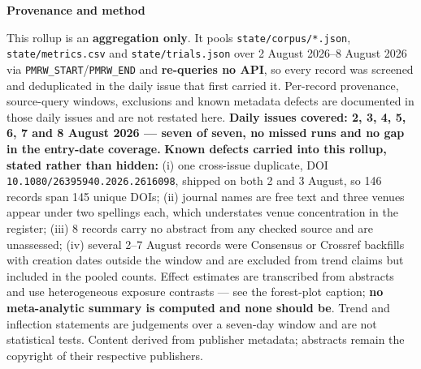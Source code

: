 \documentclass[10pt]{article}
\newcommand{\PERIODSTART}{2 August 2026}
\newcommand{\PERIODEND}{8 August 2026}
\begin{document}
\vspace{4mm}
\begin{keybox}
{\sffamily\bfseries\footnotesize\color{Deep}Provenance and method}\\[1.2mm]
{\fontsize{7.2}{8.8}\selectfont
This rollup is an \textbf{aggregation only}. It pools \texttt{state/corpus/*.json},
\texttt{state/metrics.csv} and \texttt{state/trials.json} over
\PERIODSTART{}--\PERIODEND{} via \texttt{PMRW\_START}/\texttt{PMRW\_END} and
\textbf{re-queries no API}, so every record was screened and deduplicated in the daily
issue that first carried it. Per-record provenance, source-query windows, exclusions and
known metadata defects are documented in those daily issues and are not restated here.
\textbf{Daily issues covered: 2, 3, 4, 5, 6, 7 and 8 August 2026 --- seven of seven, no
missed runs and no gap in the entry-date coverage.}
\textbf{Known defects carried into this rollup, stated rather than hidden:} (i) one
cross-issue duplicate, DOI \texttt{10.1080/26395940.2026.2616098}, shipped on both 2 and
3 August, so 146 records span 145 unique DOIs; (ii) journal names are free text and three
venues appear under two spellings each, which understates venue concentration in the
register; (iii) 8 records carry no abstract from any checked source and are unassessed;
(iv) several 2--7 August records were Consensus or Crossref backfills with creation dates
outside the window and are excluded from trend claims but included in the pooled counts.
Effect estimates are transcribed from abstracts and use heterogeneous exposure contrasts
--- see the forest-plot caption; \textbf{no meta-analytic summary is computed and none
should be}. Trend and inflection statements are judgements over a seven-day window and are
not statistical tests. Content derived from publisher metadata; abstracts remain the
copyright of their respective publishers.\par}
\end{keybox}
\end{document}
